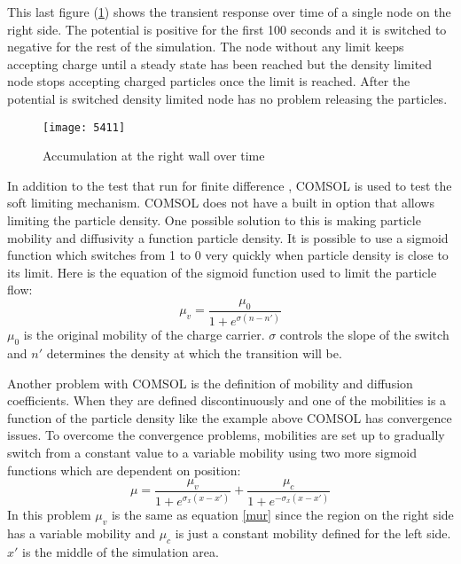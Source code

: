 \begin{doublespace}
This last figure (\ref{5411}) shows the transient response over time of a single node on the right side. The potential is positive for the first 100 seconds and it is switched to negative for the rest of the simulation. The node without any limit keeps accepting charge until a steady state has been reached but the density limited node stops accepting charged particles once the limit is reached. After the potential is switched  density limited node has no problem releasing the particles.


\begin{figure}[!htp]
\centering
\texttt{[image: 5411]}
\caption{Accumulation at the right wall over time} 
\label{5411}
\end{figure}

In addition to the test that  run for  finite difference , COMSOL is used to test the soft limiting mechanism. COMSOL does not have a built in option that allows limiting the particle density. One possible solution to this is making particle mobility and diffusivity a function particle density. It is possible to use a sigmoid function which switches from 1 to 0 very quickly when particle density is close to its limit. Here is the equation of the sigmoid function used to limit the particle flow:
\begin{equation}
\mu_v = \frac{\mu_{0}}{1+e^{\sigma(n-n')}}
\label{mur}
\end{equation} 
$\mu_0$ is the original mobility of the charge carrier. $\sigma$ controls the slope of the switch and $n'$ determines the density at which the transition will be. 

Another problem with COMSOL is the definition of mobility and diffusion coefficients. When they are defined discontinuously and one of the mobilities is a function of the particle density like the example above COMSOL has convergence issues. To overcome the convergence problems, mobilities are set up to gradually switch from a constant value to a variable mobility using two more sigmoid functions which are dependent on position:
\begin{equation}
\mu=\frac{\mu_{v}}{1+e^{\sigma_x(x-x')}}+\frac{\mu_{c}}{1+e^{-\sigma_x(x-x')}}
\end{equation}
In this problem $\mu_v$ is the same as equation \ref{mur} since the region on the right side has a variable mobility and $\mu_c$ is just a constant mobility defined for the left side. $x'$ is the middle of the simulation area.


\end{doublespace}
